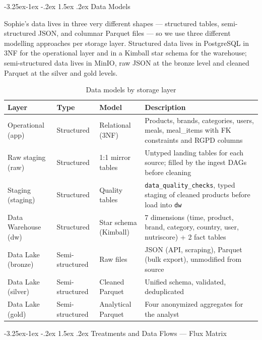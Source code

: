 \documentclass[a4paper,11pt,oneside,openany]{report}
\makeatletter
\renewcommand\subsubsection{\@startsection{subsubsection}{3}{\z@}%
  {-3.25ex\@plus -1ex \@minus -.2ex}%
  {1.5ex \@plus .2ex}%
  {\normalfont\normalsize\bfseries\color{ntblue}}}
\makeatother
\begin{document}
\subsubsection{Data Models}

Sophie's data lives in three very different shapes --- structured
tables, semi-structured JSON, and columnar Parquet files --- so we
use three different modelling approaches per storage layer.
Structured data lives in PostgreSQL in 3NF for the operational
layer and in a Kimball star schema for the warehouse;
semi-structured data lives in MinIO, raw JSON at the bronze level
and cleaned Parquet at the silver and gold levels.

\begin{table}[H]
\centering
\caption{Data models by storage layer}
\label{tab:data-models-topo}
\begin{tabularx}{\textwidth}{L{2.5cm} L{2cm} L{3.5cm} L{4.5cm}}
\toprule
\textbf{Layer} & \textbf{Type} & \textbf{Model} & \textbf{Description} \\
\midrule
Operational (app) & Structured & Relational (3NF) & Products, brands, categories, users, meals, meal\_items with FK constraints and RGPD columns \\
Raw staging (raw) & Structured & 1:1 mirror tables & Untyped landing tables for each source; filled by the ingest DAGs before cleaning \\
Staging (staging) & Structured & Quality tables & \texttt{data\_quality\_checks}, typed staging of cleaned products before load into \texttt{dw} \\
Data Warehouse (dw) & Structured & Star schema (Kimball) & 7 dimensions (time, product, brand, category, country, user, nutriscore) + 2 fact tables \\
Data Lake (bronze) & Semi-structured & Raw files & JSON (API, scraping), Parquet (bulk export), unmodified from source \\
Data Lake (silver) & Semi-structured & Cleaned Parquet & Unified schema, validated, deduplicated \\
Data Lake (gold) & Semi-structured & Analytical Parquet & Four anonymized aggregates for the analyst \\
\bottomrule
\end{tabularx}
\end{table}

\subsubsection{Treatments and Data Flows --- Flux Matrix}
\end{document}

